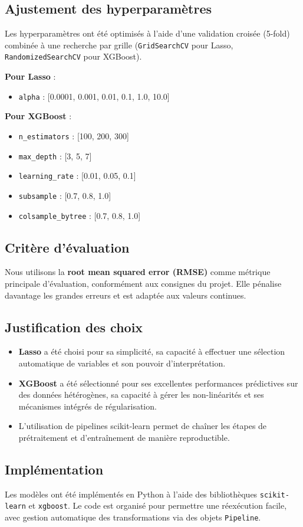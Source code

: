 \subsection*{Ajustement des hyperparamètres}

Les hyperparamètres ont été optimisés à l’aide d’une validation croisée (5-fold) combinée à une recherche par grille (\texttt{GridSearchCV} pour Lasso, \texttt{RandomizedSearchCV} pour XGBoost).

\textbf{Pour Lasso} :
\begin{itemize}
  \item \texttt{alpha} : [0.0001, 0.001, 0.01, 0.1, 1.0, 10.0]
\end{itemize}

\textbf{Pour XGBoost} :
\begin{itemize}
  \item \texttt{n\_estimators} : [100, 200, 300]
  \item \texttt{max\_depth} : [3, 5, 7]
  \item \texttt{learning\_rate} : [0.01, 0.05, 0.1]
  \item \texttt{subsample} : [0.7, 0.8, 1.0]
  \item \texttt{colsample\_bytree} : [0.7, 0.8, 1.0]
\end{itemize}

\subsection*{Critère d’évaluation}

Nous utilisons la \textbf{root mean squared error (RMSE)} comme métrique principale d’évaluation, conformément aux consignes du projet. Elle pénalise davantage les grandes erreurs et est adaptée aux valeurs continues.

\subsection*{Justification des choix}

\begin{itemize}
  \item \textbf{Lasso} a été choisi pour sa simplicité, sa capacité à effectuer une sélection automatique de variables et son pouvoir d’interprétation.
  \item \textbf{XGBoost} a été sélectionné pour ses excellentes performances prédictives sur des données hétérogènes, sa capacité à gérer les non-linéarités et ses mécanismes intégrés de régularisation.
  \item L’utilisation de pipelines scikit-learn permet de chaîner les étapes de prétraitement et d’entraînement de manière reproductible.
\end{itemize}

\subsection*{Implémentation}

Les modèles ont été implémentés en Python à l’aide des bibliothèques \texttt{scikit-learn} et \texttt{xgboost}. Le code est organisé pour permettre une réexécution facile, avec gestion automatique des transformations via des objets \texttt{Pipeline}.

